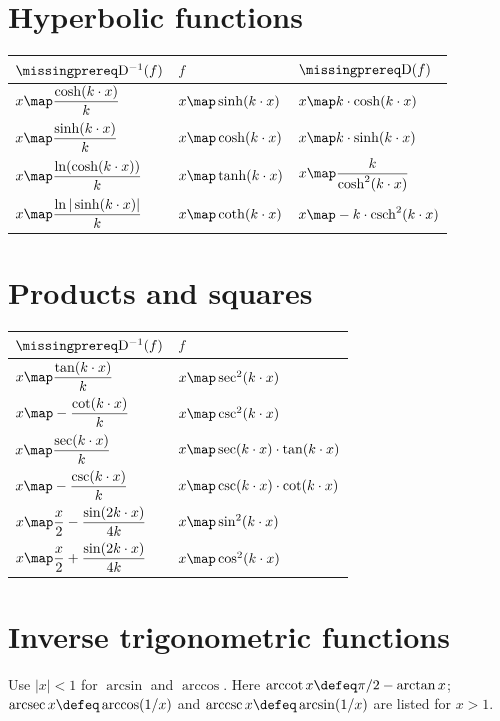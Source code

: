 \documentclass[10pt]{article}
\DeclareMathOperator{\arcsec}{arcsec}
\DeclareMathOperator{\arccsc}{arccsc}
\DeclareMathOperator{\arccot}{arccot}
\DeclareMathOperator{\csch}{csch}
\begin{document}
\section*{Hyperbolic functions}

\begin{tabularx}{\textwidth}{|Y|Y|Y|}
\hline
$\DiffOp^{-1}(f)$ & $f$ & $\DiffOp(f)$ \\ \hline
$\displaystyle x\map\frac{\cosh(k\cdot x)}k$ & $x\map\sinh(k\cdot x)$ & $x\map k\cdot\cosh(k\cdot x)$ \\ \hline
$\displaystyle x\map\frac{\sinh(k\cdot x)}k$ & $x\map\cosh(k\cdot x)$ & $x\map k\cdot\sinh(k\cdot x)$ \\ \hline
$\displaystyle x\map\frac{\ln(\cosh(k\cdot x))}k$ & $x\map\tanh(k\cdot x)$ & $\displaystyle x\map\frac{k}{\cosh^2(k\cdot x)}$ \\ \hline
$\displaystyle x\map\frac{\ln|\sinh(k\cdot x)|}k$ & $x\map\coth(k\cdot x)$ & $x\map-k\cdot\csch^2(k\cdot x)$ \\ \hline
\end{tabularx}

\section*{Products and squares}

\begin{tabularx}{\textwidth}{|Y|Y|}
\hline
$\DiffOp^{-1}(f)$ & $f$ \\ \hline
$\displaystyle x\map\frac{\tan(k\cdot x)}k$ & $x\map\sec^2(k\cdot x)$ \\ \hline
$\displaystyle x\map-\frac{\cot(k\cdot x)}k$ & $x\map\csc^2(k\cdot x)$ \\ \hline
$\displaystyle x\map\frac{\sec(k\cdot x)}k$ & $x\map\sec(k\cdot x)\cdot\tan(k\cdot x)$ \\ \hline
$\displaystyle x\map-\frac{\csc(k\cdot x)}k$ & $x\map\csc(k\cdot x)\cdot\cot(k\cdot x)$ \\ \hline
$\displaystyle x\map\frac x2-\frac{\sin(2k\cdot x)}{4k}$ & $x\map\sin^2(k\cdot x)$ \\ \hline
$\displaystyle x\map\frac x2+\frac{\sin(2k\cdot x)}{4k}$ & $x\map\cos^2(k\cdot x)$ \\ \hline
\end{tabularx}

\clearpage
\section*{Inverse trigonometric functions}
Use $|x|<1$ for $\arcsin$ and $\arccos$. Here
$\arccot x\defeq\pi/2-\arctan x$;
$\arcsec x\defeq\arccos(1/x)$ and $\arccsc x\defeq\arcsin(1/x)$ are listed for $x>1$.
\end{document}
